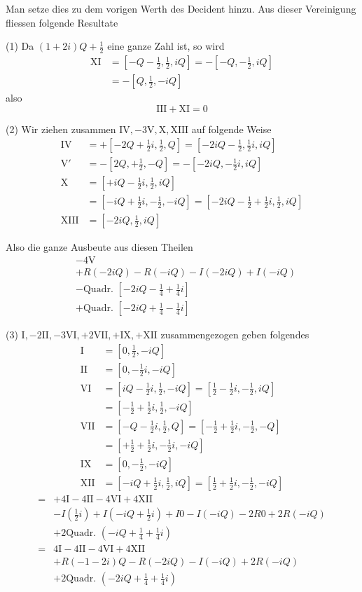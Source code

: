 Man setze dies zu dem vorigen Werth des Decident hinzu. Aus dieser Vereinigung fliessen folgende Resultate

(1) Da $(1+2i)Q+\frac12$ eine ganze Zahl ist, so wird
\[
\begin{aligned}
\mathrm{XI}&=[-Q-\tfrac12,\tfrac12,iQ]= -[-Q,-\tfrac12,iQ]\\
&=-[Q,\tfrac12,-iQ]
\end{aligned}
\]
also
\[
\mathrm{III}+\mathrm{XI}=0
\]

(2) Wir ziehen zusammen $\mathrm{IV},-3\mathrm{V},\mathrm{X},\mathrm{XIII}$ auf folgende Weise
\[
\begin{aligned}
\mathrm{IV}&=+[-2Q+\tfrac12i,\tfrac12,Q]=[-2iQ-\tfrac12,\tfrac12i,iQ]\\
\mathrm{V}'&=-[2Q,+\tfrac12,-Q]=-[-2iQ,-\tfrac12i,iQ]\\
\mathrm{X}&=[+iQ-\tfrac12i,\tfrac12,iQ]\\
&=[-iQ+\tfrac12i,-\tfrac12,-iQ]=[-2iQ-\tfrac12+\tfrac12i,\tfrac12,iQ]\\
\mathrm{XIII}&=[-2iQ,\tfrac12,iQ]
\end{aligned}
\]


Also die ganze Ausbeute aus diesen Theilen
\[
\begin{aligned}
&-4\mathrm{V}\\
&+R(-2iQ)-R(-iQ)-I(-2iQ)+I(-iQ)\\
&-\text{Quadr. }[-2iQ-\tfrac14+\tfrac14i]\\
&+\text{Quadr. }[-2iQ+\tfrac14-\tfrac14i]
\end{aligned}
\]

(3) $\mathrm{I},-2\mathrm{II},-3\mathrm{VI},+2\mathrm{VII},+\mathrm{IX},+\mathrm{XII}$ zusammengezogen geben folgendes
\[
\begin{aligned}
\mathrm{I}&=[0,\tfrac12,-iQ]\\
\mathrm{II}&=[0,-\tfrac12i,-iQ]\\
\mathrm{VI}&=[iQ-\tfrac12i,\tfrac12,-iQ]=[\tfrac12-\tfrac12i,-\tfrac12,iQ]\\
&=[-\tfrac12+\tfrac12i,\tfrac12,-iQ]\\
\mathrm{VII}&=[-Q-\tfrac12i,\tfrac12,Q]=[-\tfrac12+\tfrac12i,-\tfrac12,-Q]\\
&=[+\tfrac12+\tfrac12i,-\tfrac12i,-iQ]\\
\mathrm{IX}&=[0,-\tfrac12,-iQ]\\
\mathrm{XII}&=[-iQ+\tfrac12i,\tfrac12,iQ]=[\tfrac12+\tfrac12i,-\tfrac12,-iQ]
\end{aligned}
\]
\[
\begin{aligned}
={}&+4\mathrm{I}-4\mathrm{II}-4\mathrm{VI}+4\mathrm{XII}\\
&-I(\tfrac12i)+I(-iQ+\tfrac12i)+I0-I(-iQ)-2R0+2R(-iQ)\\
&+2\text{Quadr. }(-iQ+\tfrac14+\tfrac14i)\\
={}&4\mathrm{I}-4\mathrm{II}-4\mathrm{VI}+4\mathrm{XII}\\
&+R(-1-2i)Q-R(-2iQ)-I(-iQ)+2R(-iQ)\\
&+2\text{Quadr. }(-2iQ+\tfrac14+\tfrac14i)
\end{aligned}
\]

